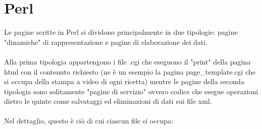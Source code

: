 \documentclass[12pt]{article}
\begin{document}
			\section{Perl}
			
				  Le pagine scritte in Perl si dividono principalmente in due tipologie: pagine "dinamiche" di rappresentazione e pagine di elaborazione dei dati.\\ \\
				Alla prima tipologia appartengono i file .cgi che eseguono il "print" della pagina html con il contenuto richiesto (ne \`e un esempio la pagina page\_template.cgi che si occupa della stampa a video di ogni ricetta) mentre le pagine della seconda tipologia sono solitamente "pagine di servizio" ovvero codice che esegue operazioni dietro le quinte come salvataggi ed eliminazioni di dati sui file xml. \\ \\Nel dettaglio, questo \`e ci\`o di cui ciascun file si occupa:
\end{document}
